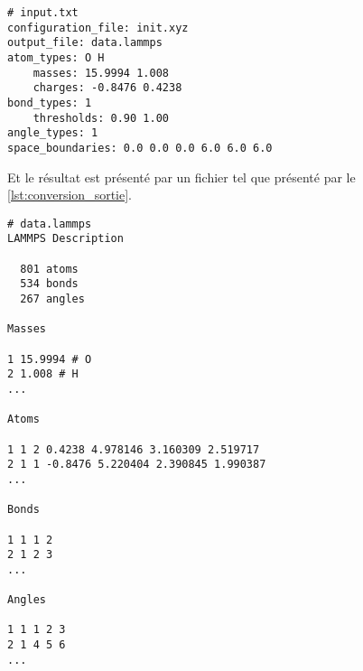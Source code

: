 \begin{lstlisting}[caption={Fichier d'entrée pour la conversion}, label={lst:conversion_input}]
# input.txt
configuration_file: init.xyz
output_file: data.lammps
atom_types: O H
	masses: 15.9994 1.008
	charges: -0.8476 0.4238
bond_types: 1
	thresholds: 0.90 1.00
angle_types: 1
space_boundaries: 0.0 0.0 0.0 6.0 6.0 6.0
\end{lstlisting}

Et le résultat est présenté par un fichier tel que présenté par le \autoref{lst:conversion_sortie}.

\begin{lstlisting}[caption={Fichier de sortie de la conversion}, label={lst:conversion_sortie}]
# data.lammps
LAMMPS Description

  801 atoms
  534 bonds
  267 angles

Masses

1 15.9994 # O
2 1.008 # H
...

Atoms

1 1 2 0.4238 4.978146 3.160309 2.519717
2 1 1 -0.8476 5.220404 2.390845 1.990387
...

Bonds

1 1 1 2 
2 1 2 3 
...

Angles

1 1 1 2 3
2 1 4 5 6
...
\end{lstlisting}